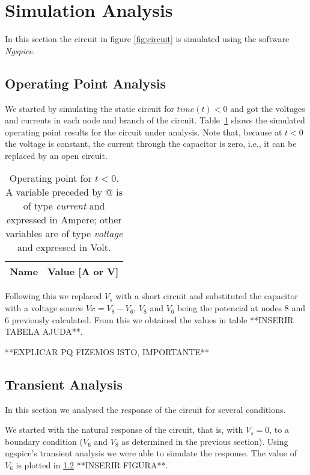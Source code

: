 \section{Simulation Analysis}
\label{sec:simulation}

In this section the circuit in figure \ref{fig:circuit} is simulated
using the software \textit{Ngspice}.

\subsection{Operating Point Analysis}

We started by simulating the static circuit for  $time (t) < 0$ and 
got the voltages and currents in each node and branch of the circuit.
Table~\ref{tab:op_tab} shows the simulated operating 
point results for the circuit under analysis.
Note that, because at $t<0$ the voltage is constant, the current through
the capacitor is zero, i.e., it can be replaced by an open circuit.

\hfill

\begin{table}[ht]
  \centering
  \begin{tabular}{|l|r|}
    \hline
    {\bf Name} & {\bf Value [A or V]} \\ \hline
    
  \end{tabular}
  \caption{Operating point for $t<0$. A variable preceded by @ is 
  of type {\em current} and expressed in Ampere; other variables 
  are of type {\it voltage} and expressed in Volt.}
  \label{tab:op_tab}
\end{table}

Following this we replaced $V_s$ with a short circuit and substituted
the capacitor with a voltage source $Vx = V_8-V_6$, $V_8$ and $V_6$
being the potencial at nodes 8 and 6 previously calculated.
From this we obtained the values in table **INSERIR TABELA AJUDA**.

**EXPLICAR PQ FIZEMOS ISTO, IMPORTANTE**


\subsection{Transient Analysis}

In this section we analysed the response of the circuit for several
conditions.

We started with the natural response of the circuit, that is, 
with $V_s=0$, to a boundary condition ($V_6$ and $V_8$ as determined 
in the previous section).
Using ngspice's transient analysis we were able to simulate the response. 
The value of $V_6$ is plotted in \ref{} **INSERIR FIGURA**.

